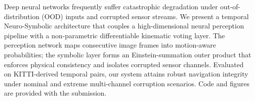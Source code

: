 Deep neural networks frequently suffer catastrophic degradation under out-of-distribution (OOD) inputs and corrupted sensor streams. We present a temporal Neuro-Symbolic architecture that couples a high-dimensional neural perception pipeline with a non-parametric differentiable kinematic voting layer. The perception network maps consecutive image frames into motion-aware probabilities; the symbolic layer forms an Einstein-summation outer product that enforces physical consistency and isolates corrupted sensor channels. Evaluated on KITTI-derived temporal pairs, our system attains robust navigation integrity under nominal and extreme multi-channel corruption scenarios. Code and figures are provided with the submission.
